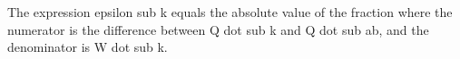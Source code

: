 The expression epsilon sub k equals the absolute value of the fraction where the numerator is the difference between Q dot sub k and Q dot sub ab, and the denominator is W dot sub k.